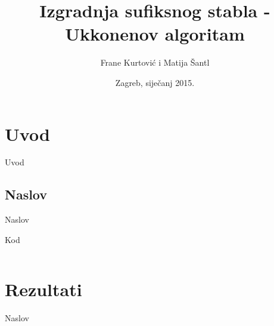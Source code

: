 \documentclass[utf8]{beamer}
\title[Projekt]{Izgradnja sufiksnog stabla - Ukkonenov algoritam}
\author{Frane Kurtović i Matija Šantl}
\institute{Bioinformatika\\*Fakultet elektrotehnike i računarstva}
\date{Zagreb, siječanj 2015.}
\begin{document}
\begin{frame}
\titlepage
\end{frame}


\section{Uvod}
\begin{frame}{Uvod}

\end{frame}

\subsection{Naslov}
\begin{frame}{Naslov}

\end{frame}

\begin{frame}[fragile]{Kod}
\begin{lstlisting}

\end{lstlisting}
\end{frame}

\section{Rezultati}
\begin{frame}{Naslov}


\end{frame}
\end{document}
